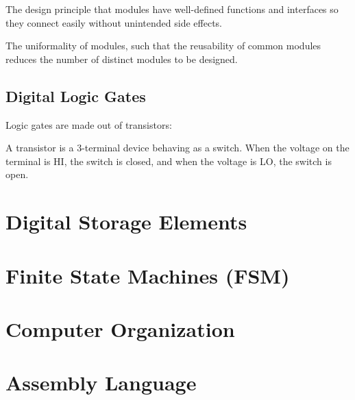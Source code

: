\documentclass[11pt]{article}
\begin{document}
\begin{definition}[Modularity]
    The design principle that modules have well-defined functions and interfaces so they connect easily without unintended side effects.
\end{definition}

\begin{definition}[Regularity]
    The uniformality of modules, such that the reusability of common modules reduces the number of distinct modules to be designed.
\end{definition}

\subsection{Digital Logic Gates}
Logic gates are made out of transistors:
\begin{definition}[Transistor]
    A transistor is a 3-terminal device behaving as a switch. When the voltage on the terminal is HI, the switch is closed, and when the voltage is LO, the switch is open.
\end{definition}



\section{Digital Storage Elements}

\section{Finite State Machines (FSM)}

\section{Computer Organization}

\section{Assembly Language}
\end{document}
